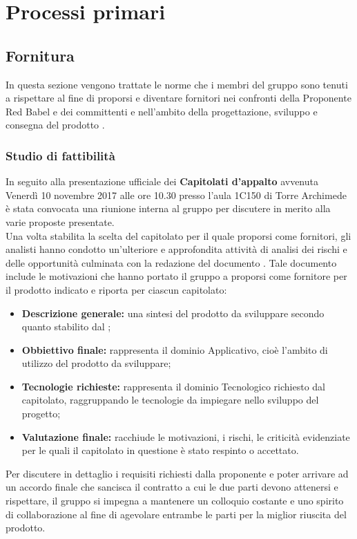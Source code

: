 \documentclass[NormeDiProgetto.tex]{subfiles}
\begin{document}
\chapter{Processi primari}
\section{Fornitura}
In questa sezione vengono trattate le norme che i membri del gruppo \gruppo sono tenuti a rispettare al fine di proporsi e diventare fornitori nei confronti della Proponente Red Babel e dei committenti \Vardanega e \Cardin nell'ambito della progettazione, sviluppo e consegna del prodotto \progetto.

\subsection{Studio di fattibilità}
In seguito alla presentazione ufficiale dei \textbf{Capitolati d'appalto} avvenuta Venerdì 10 novembre 2017 alle ore 10.30 presso l'aula 1C150 di Torre Archimede è stata convocata una riunione interna al gruppo per discutere in merito alla varie proposte presentate.\\
Una volta stabilita la scelta del capitolato per il quale proporsi come fornitori, gli analisti hanno condotto un'ulteriore e approfondita attività di analisi dei rischi e delle opportunità culminata con la redazione del documento \sdf \vruno. Tale documento include le motivazioni che hanno portato il gruppo \gruppo a proporsi come fornitore per il prodotto indicato e riporta per ciascun capitolato:
\begin{itemize}
	\item \textbf{Descrizione generale:} una sintesi del prodotto da sviluppare secondo quanto stabilito dal ;
	\item \textbf{Obbiettivo finale:} rappresenta il dominio Applicativo, cioè l'ambito di utilizzo del prodotto da sviluppare;
	\item \textbf{Tecnologie richieste:} rappresenta il dominio Tecnologico richiesto dal capitolato, raggruppando le tecnologie da impiegare nello sviluppo del progetto;
	\item \textbf{Valutazione finale:} racchiude le motivazioni, i rischi, le criticità evidenziate per le quali il capitolato in questione è stato respinto o accettato.
\end{itemize}
Per discutere in dettaglio i requisiti richiesti dalla proponente e poter arrivare ad un accordo finale che sancisca il contratto a cui le due parti devono attenersi e rispettare, il gruppo \gruppo si impegna a mantenere un colloquio costante e uno spirito di collaborazione al fine di agevolare entrambe le parti per la miglior riuscita del prodotto. 
\end{document}
